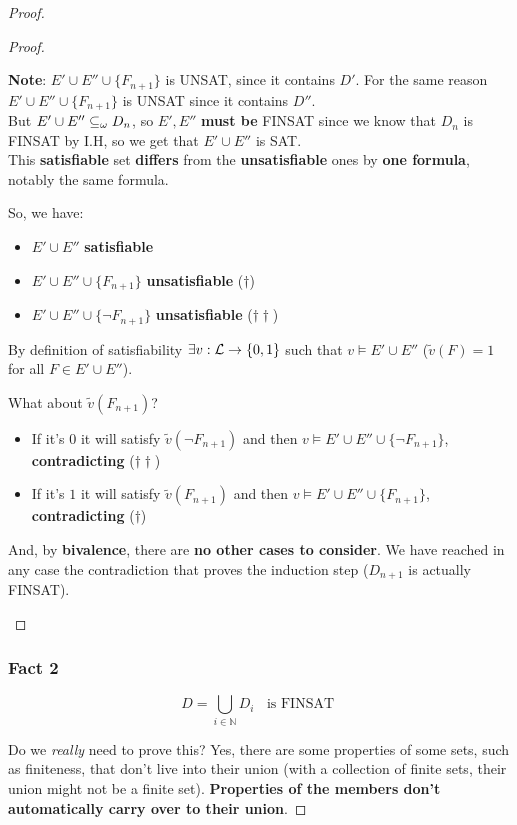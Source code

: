 \begin{proof}
\begin{proof}
\begin{itemize}
				\textbf{Note}: $E' \cup E'' \cup \{F_{n+1}\}$ is UNSAT, since it contains $D'$. For the same reason $E' \cup E'' \cup \{F_{n+1}\}$ is UNSAT since it contains $D''$. \\

				But $E' \cup E'' \subseteq_\omega D_n$, so $E', E''$ \textbf{must be} FINSAT since we know that $D_n$ is FINSAT by I.H, so we get that $E' \cup E''$ is SAT.\\

				This \textbf{satisfiable} set \textbf{differs} from the \textbf{unsatisfiable} ones by \textbf{one formula}, notably the same formula.

				So, we have:
				\begin{itemize}
					\item $E' \cup E''$ \textbf{satisfiable}
					\item $E' \cup E'' \cup \{F_{n+1}\}$ \textbf{unsatisfiable} ($\dag$)
					\item $E' \cup E'' \cup \{\neg F_{n+1}\}$ \textbf{unsatisfiable} ($\dag \dag$)
				\end{itemize}

				By definition of satisfiability $\exists v: \mathcal{L} \rightarrow \{0,1\}$ such that $v \models E' \cup E''$ ($\tilde{v}(F) =  1$ for all $F \in E' \cup E''$).

				What about $\tilde{v}(F_{n+1})$?
				\begin{itemize}
					\item If it's $0$ it will satisfy $\tilde{v} (\neg F_{n+1})$ and then $v \models E' \cup E'' \cup \{\neg F_{n+1}\}$, \textbf{contradicting} ($\dag \dag$)
					\item If it's $1$ it will satisfy $\tilde{v} (F_{n+1})$ and then $v \models E' \cup E'' \cup \{F_{n+1}\}$, \textbf{contradicting} ($\dag$)
				\end{itemize}
				And, by \textbf{bivalence}, there are \textbf{no other cases to consider}. We have reached in any case the contradiction that proves the induction step ($D_{n+1}$ is actually FINSAT).
			\end{itemize}
		\end{proof}

		\subsubsection{Fact 2}

		$$ D = \bigcup_{i \in \mathbb{N}} D_i \;\; \text{ is FINSAT } $$

		Do we \textit{really} need to prove this? Yes, there are some properties of some sets, such as finiteness, that don't live into their union (with a collection of finite sets, their union might not be a finite set). \textbf{Properties of the members don't automatically carry over to their union}.


\end{proof}
